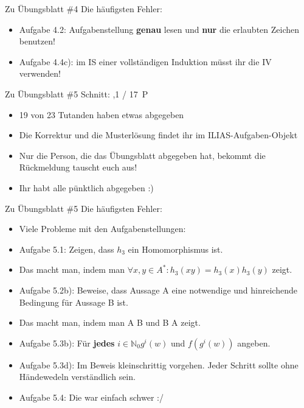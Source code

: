 \begin{frame}{Zu Übungsblatt \#4}
	Die häufigsten Fehler:
	\begin{itemize}[<+->]
		\item Aufgabe 4.2: Aufgabenstellung \textbf{genau} lesen und \textbf{nur} die erlaubten Zeichen benutzen!
		\item Aufgabe 4.4c): im IS einer vollständigen Induktion müsst ihr die IV verwenden!
	\end{itemize}
\end{frame}

\begin{frame}{Zu Übungsblatt \#5}
	Schnitt: ,1 / 17~P

	\begin{itemize}[<+->]
		\item 19 von 23 Tutanden haben etwas abgegeben
		\item Die Korrektur und die Musterlösung findet ihr im ILIAS-Aufgaben-Objekt
		\item Nur die Person, die das Übungsblatt abgegeben hat, bekommt die Rückmeldung \impl tauscht euch aus!
		\item Ihr habt alle pünktlich abgegeben :)
	\end{itemize}
\end{frame}

\begin{frame}{Zu Übungsblatt \#5}
	Die häufigsten Fehler:
	\begin{itemize}[<+->]
		\item Viele Probleme mit den Aufgabenstellungen:
		\item Aufgabe 5.1: Zeigen, dass $h_3$ ein Homomorphismus ist.
		\item[] Das macht man, indem man $\forall x,y\in A^* : h_3(xy)=h_3(x)h_3(y)$ zeigt.
		\item Aufgabe 5.2b): Beweise, dass Aussage A eine notwendige und hinreichende Bedingung für Aussage B ist.
		\item[] Das macht man, indem man A \impl B und B \impl A zeigt.
		\item Aufgabe 5.3b): Für \textbf{jedes} ${i\in\mathbb{N}_0} g^i(w)$ und $f(g^i(w))$ angeben.
		\item Aufgabe 5.3d): Im Beweis kleinschrittig vorgehen. Jeder Schritt sollte ohne Händewedeln verständlich sein.
		\item Aufgabe 5.4: Die war einfach schwer :/
	\end{itemize}
\end{frame}

